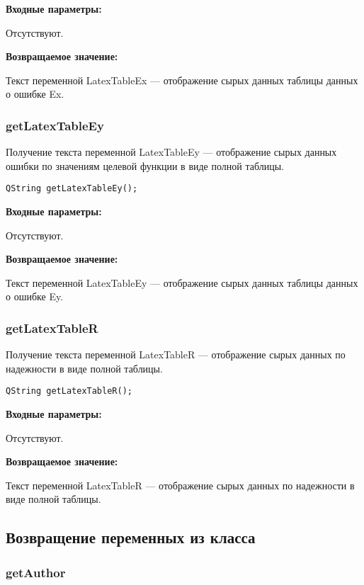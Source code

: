 \textbf{Входные параметры:}

Отсутствуют.

\textbf{Возвращаемое значение:}

Текст переменной LatexTableEx --- отображение сырых данных таблицы данных о ошибке Ex.


\subsubsection{getLatexTableEy}\label{getLatexTableEy}

Получение текста переменной LatexTableEy --- отображение сырых данных ошибки по значениям целевой функции в виде полной таблицы.


\begin{lstlisting}[label=code_syntax_getLatexTableEy,caption=Синтаксис]
QString getLatexTableEy();
\end{lstlisting}

\textbf{Входные параметры:}

Отсутствуют.

\textbf{Возвращаемое значение:}

Текст переменной LatexTableEy --- отображение сырых данных таблицы данных о ошибке Ey.


\subsubsection{getLatexTableR}\label{getLatexTableR}

Получение текста переменной LatexTableR --- отображение сырых данных по надежности в виде полной таблицы.


\begin{lstlisting}[label=code_syntax_getLatexTableR,caption=Синтаксис]
QString getLatexTableR();
\end{lstlisting}

\textbf{Входные параметры:}

Отсутствуют.

\textbf{Возвращаемое значение:}

Текст переменной LatexTableR --- отображение сырых данных по надежности в виде полной таблицы.


\subsection{Возвращение переменных из класса}

\subsubsection{getAuthor}\label{getAuthor}

